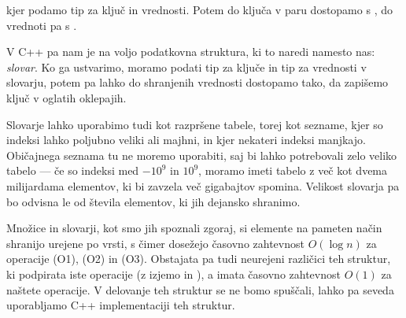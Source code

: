 
\vspace{-0.5cm}
\noindent
kjer podamo tip za ključ in vrednosti.
Potem do ključa v paru dostopamo s , do vrednoti pa s
.

V C++ pa nam je na voljo podatkovna struktura, ki to naredi namesto nas:
\emph{slovar}.
Ko ga ustvarimo, moramo podati tip za ključe in tip za vrednosti v slovarju,
potem pa lahko do shranjenih vrednosti dostopamo tako, da zapišemo ključ v
oglatih oklepajih.


Slovarje lahko uporabimo tudi kot razpršene tabele, torej kot sezname, kjer so
indeksi lahko poljubno veliki ali majhni, in kjer nekateri indeksi manjkajo. 
Običajnega seznama tu ne moremo uporabiti, saj bi lahko potrebovali zelo veliko
tabelo --- če so indeksi med $-10^9$ in $10^9$, moramo imeti tabelo z več kot
dvema milijardama elementov, ki bi zavzela več gigabajtov spomina.
Velikost slovarja pa bo odvisna le od števila elementov, ki jih dejansko
shranimo.



Množice in slovarji, kot smo jih spoznali zgoraj, si elemente na pameten način
shranijo urejene po vrsti, s čimer dosežejo časovno zahtevnost $O(\log n)$ za
operacije (O1), (O2) in (O3).
Obstajata pa tudi neurejeni različici teh struktur, ki podpirata iste operacije
(z izjemo  in ), a imata časovno zahtevnost
$O(1)$ za naštete operacije.
V delovanje teh struktur se ne bomo spuščali, lahko pa seveda uporabljamo C++
implementaciji teh struktur.




